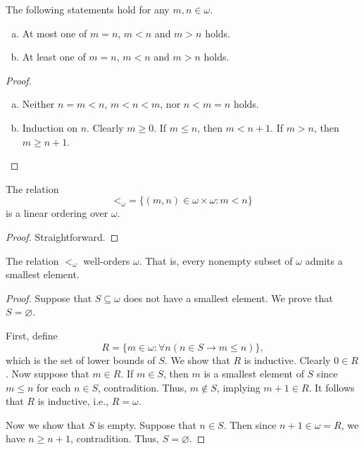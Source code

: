 \documentclass[11pt]{article}
\begin{document}
\begin{theorem}[Trichotomy]
  The following statements hold for any $m, n \in \omega$.
  \begin{enumerate}[(a)]
    \item At most one of $m = n$, $m < n$ and $m > n$ holds.
    \item At least one of $m = n$, $m < n$ and $m > n$ holds.
  \end{enumerate}
\end{theorem}
\begin{proof}
  \leavevmode
  \begin{enumerate}[(a)]
    \item Neither $n = m < n$, $m < n < m$, nor $n < m = n$ holds.
    \item Induction on $n$.
    Clearly $m \geq 0$.
    If $m \leq n$, then $m < n + 1$.
    If $m > n$, then $m \geq n + 1$.
    \qedhere
  \end{enumerate}
\end{proof}

\begin{corollary}
  The relation
  \begin{equation*}
    \mathord{<}_\omega = \{(m, n) \in \omega \times \omega: m < n\}
  \end{equation*}
  is a linear ordering over $\omega$.
\end{corollary}
\begin{proof}
  Straightforward.
\end{proof}

\begin{theorem}
  The relation $<_\omega$ well-orders $\omega$.
  That is, every nonempty subset of $\omega$ admits a smallest element.
\end{theorem}
\begin{proof}
  Suppose that $S \subseteq \omega$ does not have a smallest element.
  We prove that $S = \varnothing$.
  \par First, define
  \begin{equation*}
    R = \{m \in \omega: \forall n (n \in S \to m \leq n)\},
  \end{equation*}
  which is the set of lower bounds of $S$.
  We show that $R$ is inductive.
  Clearly $0 \in R$.
  Now suppose that $m \in R$.
  If $m \in S$, then $m$ is a smallest element of $S$ since $m \leq n$ for each $n \in S$, contradition.
  Thus, $m \notin S$, implying $m + 1 \in R$.
  It follows that $R$ is inductive, i.e., $R = \omega$.
  \par Now we show that $S$ is empty.
  Suppose that $n \in S$.
  Then since $n + 1 \in \omega = R$, we have $n \geq n + 1$, contradition.
  Thus, $S = \varnothing$.
\end{proof}
\end{document}
